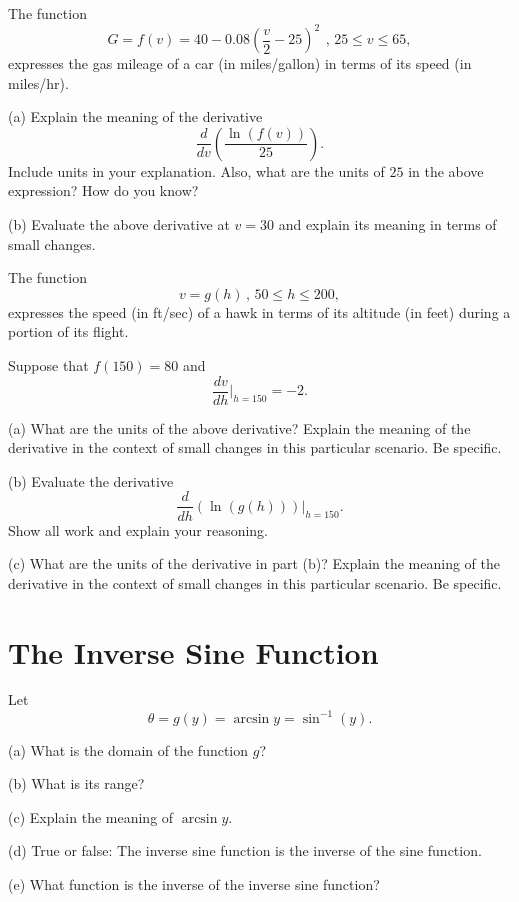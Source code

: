 \documentclass{ximera}
\begin{document}
\begin{question}  \label{Qd654thmm}
The function 
\[ 
      G = f(v) = 40-0.08\left(\frac{v}{2}-25\right)^{2}\, \ , \, 25\leq v\leq 65 ,
\]
expresses the gas mileage of a car (in miles/gallon) in terms of its speed (in miles/hr).

(a) Explain the meaning of the derivative 
\[
     \frac{d}{dv} \left( \frac{\ln (f(v))}{25} \right) .
\]
Include units in your explanation. Also, what are the units of $25$ in the above expression? How do you know?

(b) Evaluate the above derivative at $v=30$ and explain its meaning in terms of small changes.

\end{question}


\begin{question}   \label{Qdfdfnnn}
The function
\[
    v =g(h) \, , \, 50\leq h \leq 200 , 
\]
expresses the speed (in ft/sec) of a hawk in terms of its altitude (in feet) during a portion of its flight.

Suppose that $f(150) = 80$ and
\[
     \frac{dv}{dh}\Big|_{h=150} = -2 .
\]

(a) What are the units of the above derivative? Explain the meaning of the derivative in the context of small changes in this particular scenario. Be specific.

(b) Evaluate the derivative
\[
    \frac{d}{dh} \left( \ln (g(h))\right)\Big|_{h=150}.
\]
Show all work and explain your reasoning.

(c) What are the units of the derivative in part (b)? Explain the meaning of the derivative in the context of small changes in this particular scenario. Be specific.

\end{question}


\section*{The Inverse Sine Function}
Let
\[
  \theta = g(y) = \arcsin y = \sin^{-1}(y).
\]

(a) What is the domain of the function $g$?

(b) What is its range?

(c) Explain the meaning of $\arcsin y$.

(d) True or false: The inverse sine function is the inverse of the sine function.

(e) What function is the inverse of the inverse sine function?
\end{document}
